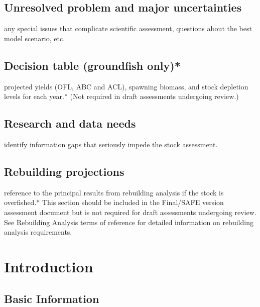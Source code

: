 \documentclass[12pt,]{article}
\begin{document}
\subsection*{Unresolved problem and major
uncertainties}\label{unresolved-problem-and-major-uncertainties}

any special issues that complicate scientific assessment, questions
about the best model scenario, etc.

\subsection*{Decision table (groundfish
only)*}\label{decision-table-groundfish-only}

projected yields (OFL, ABC and ACL), spawning biomass, and stock
depletion levels for each year.* (Not required in draft assessments
undergoing review.)

\subsection*{Research and data needs}\label{research-and-data-needs}

identify information gaps that seriously impede the stock assessment.

\subsection*{Rebuilding projections}\label{rebuilding-projections}

reference to the principal results from rebuilding analysis if the stock
is overfished.* This section should be included in the Final/SAFE
version assessment document but is not required for draft assessments
undergoing review. See Rebuilding Analysis terms of reference for
detailed information on rebuilding analysis requirements.

\section{Introduction}\label{introduction}

\subsection{Basic Information}\label{basic-information}
\end{document}
